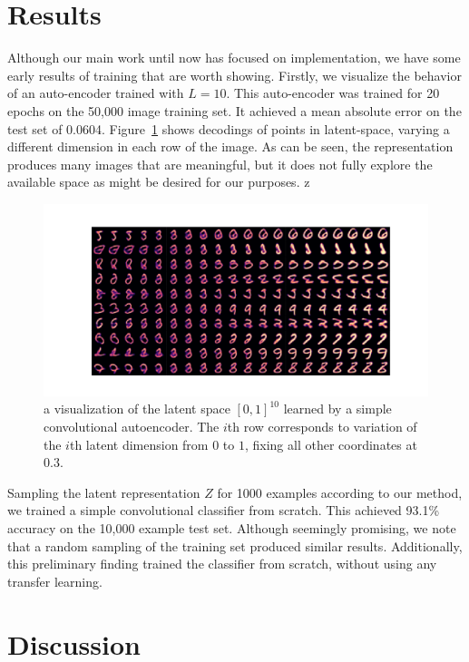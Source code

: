 \documentclass[a4paper]{article}
\begin{document}
\section{Results}
\label{sec:results}

Although our main work until now has focused on implementation, we have some
early results of training that are worth showing. Firstly, we visualize the
behavior of an auto-encoder trained with $L = 10$. This auto-encoder was trained
for 20 epochs on the 50,000 image training set. It achieved a mean absolute
error on the test set of 0.0604. Figure~\ref{fig:autoencoder-visualization}
shows decodings of points in latent-space, varying a different dimension in each
row of the image. As can be seen, the representation produces many images that
are meaningful, but it does not fully explore the available space as might be
desired for our purposes.
z
\begin{figure}
  \centering
  \includegraphics[width=\linewidth]{docs/visualize_decoding}
  \caption{a visualization of the latent space $[0,1]^{10}$ learned by a simple
    convolutional autoencoder. The $i$th row corresponds to variation of the
    $i$th latent dimension from $0$ to $1$, fixing all other coordinates at
    $0.3$.}
  \label{fig:autoencoder-visualization}
\end{figure}

Sampling the latent representation $Z$ for 1000 examples according to our
method, we trained a simple convolutional classifier from scratch. This achieved
93.1\% accuracy on the 10,000 example test set. Although seemingly promising, we
note that a random sampling of the training set produced similar
results. Additionally, this preliminary finding trained the classifier from
scratch, without using any transfer learning.

\section{Discussion}
\label{sec:discussion}
\end{document}
